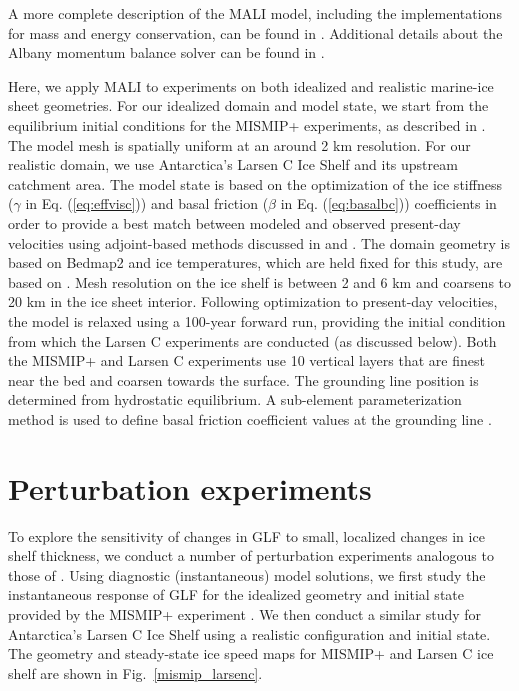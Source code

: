 \documentclass[tc, manuscript]{copernicus}
\begin{document}
A more complete description of the MALI model, including the implementations for mass and energy conservation, can be found in \citet{hoffman2018}. Additional details about the Albany momentum balance solver can be found in \citet{tezaur2015a,tezaur2015b}. 

Here, we apply MALI to experiments on both idealized and realistic marine-ice sheet geometries. For our idealized domain and model state, we start from the equilibrium initial conditions for the MISMIP+ experiments, as described in \citet{asay2016}. The model mesh is spatially uniform at an around 2 km resolution. For our realistic domain, we use Antarctica's Larsen C Ice Shelf and its upstream catchment area. The model state is based on the optimization of the ice stiffness ($\gamma$ in Eq. (\ref{eq:effvisc})) and basal friction ($\beta$ in Eq. (\ref{eq:basalbc})) coefficients in order to provide a best match between modeled and observed present-day velocities \citep{rignot2014} using adjoint-based methods discussed in \citet{perego2014} and \citet{hoffman2018}. The domain geometry is based on Bedmap2 \citep{fretwell2013} and ice temperatures, which are held fixed for this study, are based on \citet{liefferinge2013}. Mesh resolution on the ice shelf is between 2 and 6 km and coarsens to 20 km in the ice sheet interior. Following optimization to present-day velocities, the model is relaxed using a 100-year forward run, providing the initial condition from which the Larsen C experiments are conducted (as discussed below). Both the MISMIP+ and Larsen C experiments use 10 vertical layers that are finest near the bed and coarsen towards the surface. The grounding line position is determined from hydrostatic equilibrium. A sub-element parameterization method is used to define basal friction coefficient values at the grounding line \citep{seroussi2014}. 


\section{Perturbation experiments}

To explore the sensitivity of changes in GLF to small, localized changes in ice shelf thickness, we conduct a number of perturbation experiments analogous to those of \citet{reese2018}. Using diagnostic (instantaneous) model solutions, we first study the instantaneous response of GLF for the idealized geometry and initial state provided by the MISMIP+ experiment \citep{asay2016}. We then conduct a similar study for Antarctica's Larsen C Ice Shelf using a realistic configuration and initial state. The geometry and steady-state ice speed maps for MISMIP+ and Larsen C ice shelf are shown in Fig.~\ref{mismip_larsenc}.
\end{document}
